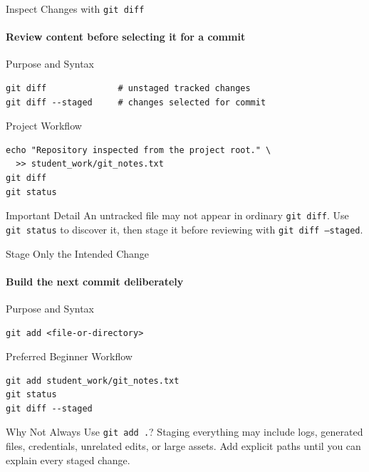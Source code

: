 \begin{frame}[fragile]{Inspect Changes with \texttt{git diff}}
\framesubtitle{Review content before selecting it for a commit}
\footnotesize
\begin{block}{Purpose and Syntax}
\begin{verbatim}
git diff              # unstaged tracked changes
git diff --staged     # changes selected for commit
\end{verbatim}
\end{block}
\begin{exampleblock}{Project Workflow}
\begin{verbatim}
echo "Repository inspected from the project root." \
  >> student_work/git_notes.txt
git diff
git status
\end{verbatim}
\end{exampleblock}
\begin{alertblock}{Important Detail}
An untracked file may not appear in ordinary \texttt{git diff}. Use \texttt{git status} to discover it, then stage it before reviewing with \texttt{git diff --staged}.
\end{alertblock}
\end{frame}

\begin{frame}[fragile]{Stage Only the Intended Change}
\framesubtitle{Build the next commit deliberately}
\footnotesize
\begin{block}{Purpose and Syntax}
\begin{verbatim}
git add <file-or-directory>
\end{verbatim}
\end{block}
\begin{exampleblock}{Preferred Beginner Workflow}
\begin{verbatim}
git add student_work/git_notes.txt
git status
git diff --staged
\end{verbatim}
\end{exampleblock}
\begin{alertblock}{Why Not Always Use \texttt{git add .}?}
Staging everything may include logs, generated files, credentials, unrelated edits, or large assets. Add explicit paths until you can explain every staged change.
\end{alertblock}
\end{frame}

